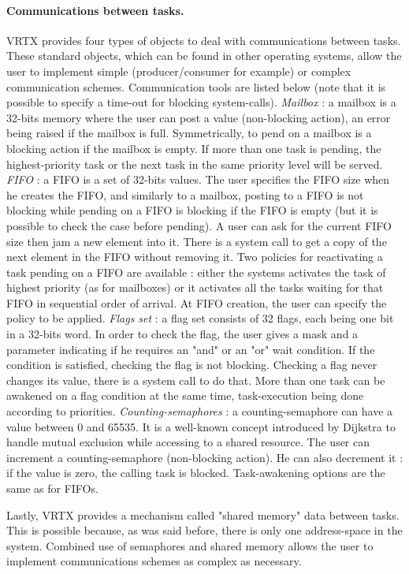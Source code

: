 \documentclass[10pt]{report}
\begin{document}
\paragraph{Communications between tasks.} VRTX provides four types of objects to deal with communications
between tasks. These standard objects, which can be found in other
operating systems, allow the user to implement simple
(producer/consumer for example) or complex communication schemes.
Communication tools are listed below (note that it is possible to
specify a time-out for blocking system-calls). {\em Mailbox} : a
mailbox is a 32-bits memory where the user can post a value (non-blocking 
action), an error being raised if the mailbox is full.
Symmetrically, to pend on a mailbox is a blocking action if the
mailbox is empty. If more than one task is pending, the
highest-priority task or the next task in the same priority level
will be served. {\em FIFO} :
a FIFO is a set of 32-bits values. The
user specifies the FIFO size when he creates the FIFO, and
similarly to a mailbox, posting to a FIFO is not blocking while
pending on a FIFO is blocking if the FIFO is empty (but it is possible
to check the case before pending). A user can ask for the current
FIFO size then jam a new element into it. There is a system call
to get a copy of the next element in the FIFO without removing
it. Two policies for reactivating a task pending on a FIFO are
available : either the systems activates the task of highest
priority (as for mailboxes) or it activates all the tasks waiting
for that FIFO in sequential order of arrival. At FIFO creation,
the user can specify the policy to be applied. {\em Flags set} : a
flag set consists of 32 flags, each being one bit in a 32-bits word. In
order to check the flag, the user gives a mask and a parameter
indicating if he requires an "and" or an "or" wait condition. If the
condition is satisfied, checking the flag is not blocking.
Checking a flag never changes its value, there is a system call
to do that. More than one task can be awakened on a flag condition
at the same time, task-execution being done according to
priorities. {\em Counting-semaphores} : a counting-semaphore can have
a value between 0 and 65535. It is a well-known concept
introduced by Dijkstra to handle mutual exclusion while accessing
to a shared resource. The user can increment a counting-semaphore
(non-blocking action). He can also decrement it : if the value is
zero, the calling task is blocked. Task-awakening options are the
same as for FIFOs.

Lastly, VRTX provides a mechanism called "shared memory"
data between tasks. This is possible because, as was said before,
there is only one address-space in the system. Combined use of
semaphores and shared memory allows the user to implement
communications schemes as complex as necessary.
\end{document}
